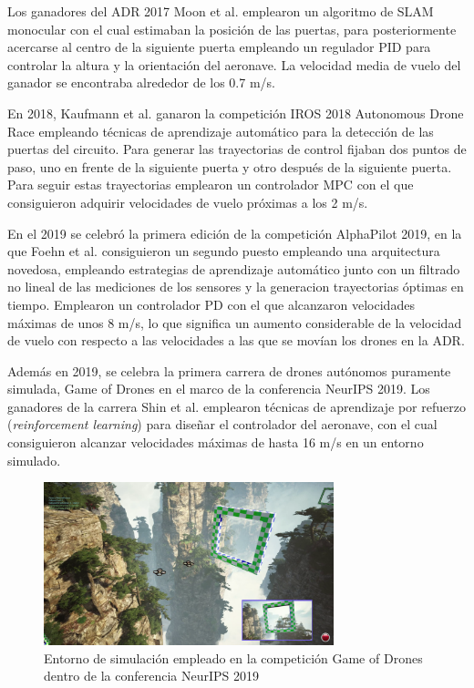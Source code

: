 Los ganadores del ADR 2017 Moon et al. \cite{moon2019challenges} emplearon un algoritmo de SLAM monocular con el cual estimaban la posición de las puertas, para posteriormente acercarse al centro de la siguiente puerta empleando un regulador PID para controlar la altura y la orientación del aeronave. La velocidad media de vuelo del ganador se encontraba alrededor de los 0.7 m/s. 

En 2018, Kaufmann et al. \cite{BeautyAndTheBeast} ganaron la competición IROS 2018 Autonomous Drone Race  empleando técnicas de aprendizaje automático para la detección de las puertas del circuito. Para generar las trayectorias de control fijaban dos puntos de paso, uno en frente de la siguiente puerta y otro después de la siguiente puerta. Para seguir estas trayectorias emplearon un controlador MPC con el que consiguieron adquirir velocidades de vuelo próximas a los 2 m/s.

En el 2019 se celebró la primera edición de la competición AlphaPilot 2019, en la que Foehn et al. \cite{foehn2020alphapilot} consiguieron un segundo puesto empleando una arquitectura novedosa, empleando estrategias de aprendizaje automático junto con un filtrado no lineal de las mediciones de los sensores y la generacion trayectorias óptimas en tiempo. Emplearon un controlador PD con el que alcanzaron velocidades máximas de unos 8 m/s, lo que significa un aumento considerable de la velocidad de vuelo con respecto a las velocidades a las que se movían los drones en la ADR.

Además en 2019, se celebra la primera carrera de drones autónomos puramente simulada, Game of Drones en el marco de la conferencia NeurIPS 2019. Los ganadores de la carrera Shin et al. \cite{shinreport} emplearon técnicas de aprendizaje por refuerzo  (\textit{reinforcement learning}) para diseñar el controlador del aeronave, con el cual consiguieron alcanzar velocidades máximas de hasta 16 m/s en un entorno simulado.

\begin{figure}[htb!]
	\centering
	\includegraphics[width=0.75\textwidth]{imagenes/gameofdrones}
	\caption{Entorno de simulación empleado en la competición Game of Drones dentro de la conferencia NeurIPS 2019}
	\label{estado:GoD}
\end{figure}








